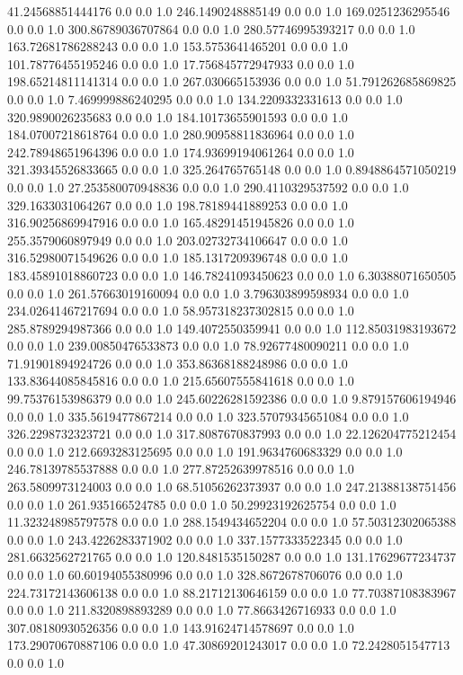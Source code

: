 41.24568851444176	0.0	0.0	1.0
246.1490248885149	0.0	0.0	1.0
169.0251236295546	0.0	0.0	1.0
300.86789036707864	0.0	0.0	1.0
280.57746995393217	0.0	0.0	1.0
163.72681786288243	0.0	0.0	1.0
153.5753641465201	0.0	0.0	1.0
101.78776455195246	0.0	0.0	1.0
17.756845772947933	0.0	0.0	1.0
198.65214811141314	0.0	0.0	1.0
267.030665153936	0.0	0.0	1.0
51.791262685869825	0.0	0.0	1.0
7.469999886240295	0.0	0.0	1.0
134.2209332331613	0.0	0.0	1.0
320.9890026235683	0.0	0.0	1.0
184.10173655901593	0.0	0.0	1.0
184.07007218618764	0.0	0.0	1.0
280.90958811836964	0.0	0.0	1.0
242.78948651964396	0.0	0.0	1.0
174.93699194061264	0.0	0.0	1.0
321.39345526833665	0.0	0.0	1.0
325.264765765148	0.0	0.0	1.0
0.8948864571050219	0.0	0.0	1.0
27.253580070948836	0.0	0.0	1.0
290.4110329537592	0.0	0.0	1.0
329.1633031064267	0.0	0.0	1.0
198.78189441889253	0.0	0.0	1.0
316.90256869947916	0.0	0.0	1.0
165.48291451945826	0.0	0.0	1.0
255.3579060897949	0.0	0.0	1.0
203.02732734106647	0.0	0.0	1.0
316.52980071549626	0.0	0.0	1.0
185.1317209396748	0.0	0.0	1.0
183.45891018860723	0.0	0.0	1.0
146.78241093450623	0.0	0.0	1.0
6.30388071650505	0.0	0.0	1.0
261.57663019160094	0.0	0.0	1.0
3.796303899598934	0.0	0.0	1.0
234.02641467217694	0.0	0.0	1.0
58.957318237302815	0.0	0.0	1.0
285.8789294987366	0.0	0.0	1.0
149.4072550359941	0.0	0.0	1.0
112.85031983193672	0.0	0.0	1.0
239.00850476533873	0.0	0.0	1.0
78.92677480090211	0.0	0.0	1.0
71.91901894924726	0.0	0.0	1.0
353.86368188248986	0.0	0.0	1.0
133.83644085845816	0.0	0.0	1.0
215.65607555841618	0.0	0.0	1.0
99.75376153986379	0.0	0.0	1.0
245.60226281592386	0.0	0.0	1.0
9.879157606194946	0.0	0.0	1.0
335.5619477867214	0.0	0.0	1.0
323.57079345651084	0.0	0.0	1.0
326.2298732323721	0.0	0.0	1.0
317.8087670837993	0.0	0.0	1.0
22.126204775212454	0.0	0.0	1.0
212.6693283125695	0.0	0.0	1.0
191.9634760683329	0.0	0.0	1.0
246.78139785537888	0.0	0.0	1.0
277.87252639978516	0.0	0.0	1.0
263.5809973124003	0.0	0.0	1.0
68.51056262373937	0.0	0.0	1.0
247.21388138751456	0.0	0.0	1.0
261.935166524785	0.0	0.0	1.0
50.29923192625754	0.0	0.0	1.0
11.323248985797578	0.0	0.0	1.0
288.1549434652204	0.0	0.0	1.0
57.50312302065388	0.0	0.0	1.0
243.4226283371902	0.0	0.0	1.0
337.1577333522345	0.0	0.0	1.0
281.6632562721765	0.0	0.0	1.0
120.8481535150287	0.0	0.0	1.0
131.17629677234737	0.0	0.0	1.0
60.60194055380996	0.0	0.0	1.0
328.8672678706076	0.0	0.0	1.0
224.73172143606138	0.0	0.0	1.0
88.21712130646159	0.0	0.0	1.0
77.70387108383967	0.0	0.0	1.0
211.8320898893289	0.0	0.0	1.0
77.8663426716933	0.0	0.0	1.0
307.08180930526356	0.0	0.0	1.0
143.91624714578697	0.0	0.0	1.0
173.29070670887106	0.0	0.0	1.0
47.30869201243017	0.0	0.0	1.0
72.2428051547713	0.0	0.0	1.0
